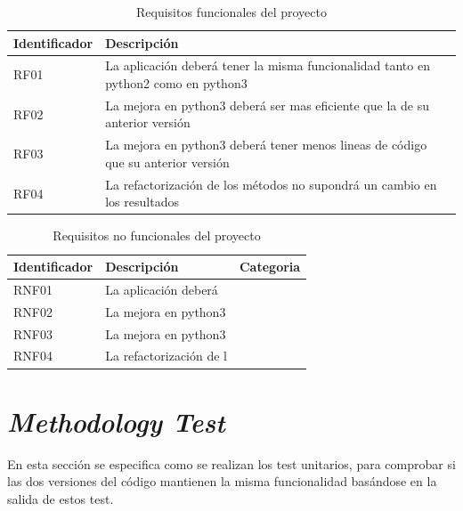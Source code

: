 \documentclass{cosas/tfg_domingo}
\begin{document}
\begin{table}[h]
\centering
\begin{tabular}{|l|l|}
\hline
Identificador & Descripción                                                                        \\ \hline
RF01          & La aplicación deberá tener la misma funcionalidad tanto en python2 como en python3 \\ \hline
RF02          & La mejora en python3 deberá ser mas eficiente que la de su anterior versión        \\ \hline
RF03          & La mejora en python3 deberá tener menos lineas de código que su anterior versión   \\ \hline
RF04          & La refactorización de los métodos no supondrá un cambio en los resultados          \\ \hline
\end{tabular}
\caption{Requisitos funcionales del proyecto}
\label{tab:my-table}
\end{table}


\begin{table}[h]
\centering
\begin{tabular}{|l|l|l|}
\hline
Identificador & Descripción                                                                           & Categoria \\ \hline
RNF01         & La aplicación deberá          & \\ \hline
RNF02         & La mejora en python3        &           \\ \hline
RNF03         & La mejora en python3    &           \\ \hline
RNF04         & La refactorización de l         &           \\ \hline
\end{tabular}
\caption{Requisitos no funcionales del proyecto}
\label{tab:my-table}
\end{table}



\chapter{\emph{Methodology Test}}

En esta sección se especifica como se realizan los test unitarios, para comprobar si las dos versiones del código mantienen la misma funcionalidad basándose en la salida de estos test.
\end{document}
